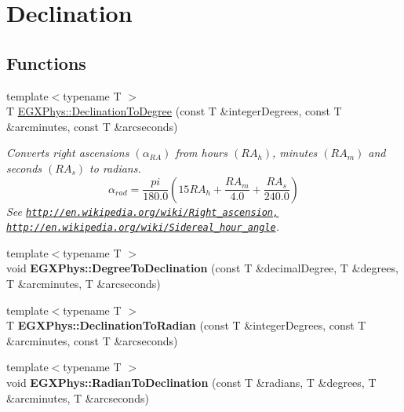 \hypertarget{group___e_g_x_phys-_astrophysics-_declination}{}\section{Declination}
\label{group___e_g_x_phys-_astrophysics-_declination}
\subsection*{Functions}
\begin{DoxyCompactItemize}
\item 
{\footnotesize template$<$typename T $>$ }\\T \mbox{\hyperlink{group___e_g_x_phys-_astrophysics-_declination_gadcadb4f709a5115a8edb18c872af9eda}{E\+G\+X\+Phys\+::\+Declination\+To\+Degree}} (const T \&integer\+Degrees, const T \&arcminutes, const T \&arcseconds)
\begin{DoxyCompactList}\small\item\em Converts right ascensions $(\alpha_{RA})$ from hours $(RA_h)$, minutes $(RA_m)$ and seconds $(RA_s)$ to radians. \[\alpha_{rad}=\frac{pi}{180.0}(15 RA_h + \frac{RA_m}{4.0} + \frac{RA_s}{240.0})\] See \href{http://en.wikipedia.org/wiki/Right_ascension,}{\tt http\+://en.\+wikipedia.\+org/wiki/\+Right\+\_\+ascension,} \href{http://en.wikipedia.org/wiki/Sidereal_hour_angle}{\tt http\+://en.\+wikipedia.\+org/wiki/\+Sidereal\+\_\+hour\+\_\+angle}. \end{DoxyCompactList}\item 
\mbox{\label{group___e_g_x_phys-_astrophysics-_declination_ga4f3c37a00f59722857bcd4e6acd01865}} 
{\footnotesize template$<$typename T $>$ }\\void {\bfseries E\+G\+X\+Phys\+::\+Degree\+To\+Declination} (const T \&decimal\+Degree, T \&degrees, T \&arcminutes, T \&arcseconds)
\item 
\mbox{\label{group___e_g_x_phys-_astrophysics-_declination_gaeddd0fbc1c695863bf2bbc2a948b9b59}} 
{\footnotesize template$<$typename T $>$ }\\T {\bfseries E\+G\+X\+Phys\+::\+Declination\+To\+Radian} (const T \&integer\+Degrees, const T \&arcminutes, const T \&arcseconds)
\item 
\mbox{\label{group___e_g_x_phys-_astrophysics-_declination_gaa91fc4b5a4ac9e9dc94aff7b8f6f9bd1}} 
{\footnotesize template$<$typename T $>$ }\\void {\bfseries E\+G\+X\+Phys\+::\+Radian\+To\+Declination} (const T \&radians, T \&degrees, T \&arcminutes, T \&arcseconds)
\end{DoxyCompactItemize}


